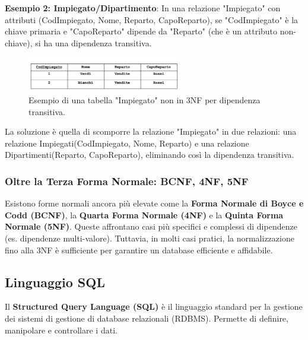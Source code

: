 \textbf{Esempio 2: Impiegato/Dipartimento}:
In una relazione "Impiegato" con attributi (CodImpiegato, Nome, Reparto, CapoReparto), se "CodImpiegato" è la chiave primaria e "CapoReparto" dipende da "Reparto" (che è un attributo non-chiave), si ha una dipendenza transitiva.
\begin{figure}[h!]
    \centering
    \includegraphics[width=0.6\textwidth]{immagini/nf_3nf_esempio_impiegato.png} %
    \caption{Esempio di una tabella "Impiegato" non in 3NF per dipendenza transitiva.}
    \label{fig:nf_3nf_impiegato}
\end{figure}
La soluzione è quella di scomporre la relazione "Impiegato" in due relazioni: una relazione Impiegati(CodImpiegato, Nome, Reparto) e una relazione Dipartimenti(Reparto, CapoReparto), eliminando così la dipendenza transitiva.

\subsubsection{Oltre la Terza Forma Normale: BCNF, 4NF, 5NF}
Esistono forme normali ancora più elevate come la \textbf{Forma Normale di Boyce e Codd (BCNF)}, la \textbf{Quarta Forma Normale (4NF)} e la \textbf{Quinta Forma Normale (5NF)}. Queste affrontano casi più specifici e complessi di dipendenze (es. dipendenze multi-valore). Tuttavia, in molti casi pratici, la normalizzazione fino alla 3NF è sufficiente per garantire un database efficiente e affidabile.

\subsection{Linguaggio SQL}
Il \textbf{Structured Query Language (SQL)} è il linguaggio standard per la gestione dei sistemi di gestione di database relazionali (RDBMS). Permette di definire, manipolare e controllare i dati.

